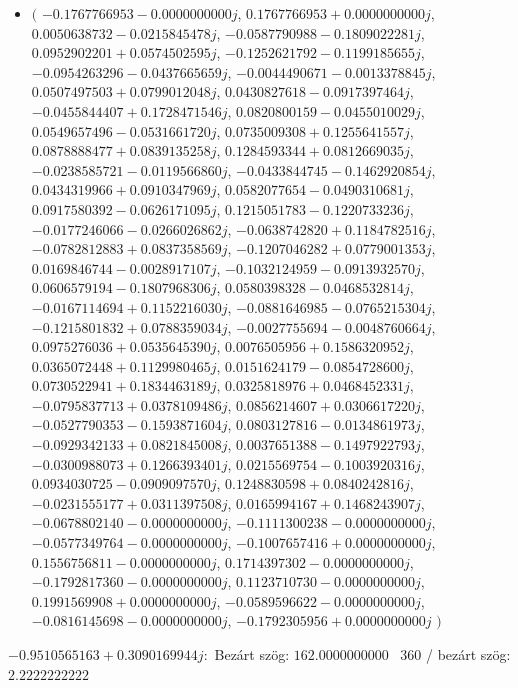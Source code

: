 \documentclass[14pt,a4paper]{article}
\begin{document}
\begin{itemize}
\item
$\big($
$-0.1767766953-0.0000000000j$, $0.1767766953+0.0000000000j$, $0.0050638732-0.0215845478j$, $-0.0587790988-0.1809022281j$, $0.0952902201+0.0574502595j$, $-0.1252621792-0.1199185655j$, $-0.0954263296-0.0437665659j$, $-0.0044490671-0.0013378845j$, $0.0507497503+0.0799012048j$, $0.0430827618-0.0917397464j$, $-0.0455844407+0.1728471546j$, $0.0820800159-0.0455010029j$, $0.0549657496-0.0531661720j$, $0.0735009308+0.1255641557j$, $0.0878888477+0.0839135258j$, $0.1284593344+0.0812669035j$, $-0.0238585721-0.0119566860j$, $-0.0433844745-0.1462920854j$, $0.0434319966+0.0910347969j$, $0.0582077654-0.0490310681j$, $0.0917580392-0.0626171095j$, $0.1215051783-0.1220733236j$, $-0.0177246066-0.0266026862j$, $-0.0638742820+0.1184782516j$, $-0.0782812883+0.0837358569j$, $-0.1207046282+0.0779001353j$, $0.0169846744-0.0028917107j$, $-0.1032124959-0.0913932570j$, $0.0606579194-0.1807968306j$, $0.0580398328-0.0468532814j$, $-0.0167114694+0.1152216030j$, $-0.0881646985-0.0765215304j$, $-0.1215801832+0.0788359034j$, $-0.0027755694-0.0048760664j$, $0.0975276036+0.0535645390j$, $0.0076505956+0.1586320952j$, $0.0365072448+0.1129980465j$, $0.0151624179-0.0854728600j$, $0.0730522941+0.1834463189j$, $0.0325818976+0.0468452331j$, $-0.0795837713+0.0378109486j$, $0.0856214607+0.0306617220j$, $-0.0527790353-0.1593871604j$, $0.0803127816-0.0134861973j$, $-0.0929342133+0.0821845008j$, $0.0037651388-0.1497922793j$, $-0.0300988073+0.1266393401j$, $0.0215569754-0.1003920316j$, $0.0934030725-0.0909097570j$, $0.1248830598+0.0840242816j$, $-0.0231555177+0.0311397508j$, $0.0165994167+0.1468243907j$, $-0.0678802140-0.0000000000j$, $-0.1111300238-0.0000000000j$, $-0.0577349764-0.0000000000j$, $-0.1007657416+0.0000000000j$, $0.1556756811-0.0000000000j$, $0.1714397302-0.0000000000j$, $-0.1792817360-0.0000000000j$, $0.1123710730-0.0000000000j$, $0.1991569908+0.0000000000j$, $-0.0589596622-0.0000000000j$, $-0.0816145698-0.0000000000j$, $-0.1792305956+0.0000000000j$
$\big)$
\end{itemize}
$-0.9510565163+0.3090169944j$:\
Bezárt szög: $162.0000000000$ \
360 / bezárt szög: $2.2222222222$\
\end{document}
